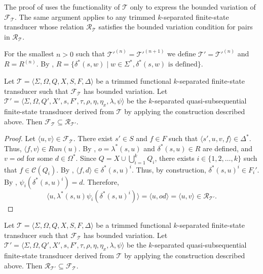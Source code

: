 The proof of  uses the functionality of $\mathcal{T}$
only to express the bounded variation of $\mathcal{F}_\mathcal{T}$. The same argument
applies to any trimmed $k$-separated finite-state transducer whose relation
$\mathcal{R}_\mathcal{T}$ satisfies the bounded variation condition for pairs in
$\mathcal{R}_\mathcal{T}$.

For the smallest $n > 0$ such that $\mathcal{T}'^{(n)} = \mathcal{T}'^{(n+1)}$ we
define $\mathcal{T}' = \mathcal{T}'^{(n)}$ and $R = R^{(n)}$. By
, $R = \{ \delta^*(s, w) \mid w \in \Sigma^*,
\delta^*(s, w) \textrm{ is defined} \}$.

\begin{lemma}\label{lem:quasisubseq_inclusion_right}
  Let $\mathcal{T} = \langle \Sigma, \Omega, Q, X, S, F, \Delta \rangle$ be a trimmed
  functional $k$-separated finite-state transducer such that
  $\mathcal{F}_\mathcal{T}$ has bounded variation.
  Let $\mathcal{T}' = \langle \Sigma, \Omega, Q', X', s, F', \tau, \rho, \eta,
  \eta_x, \lambda, \psi \rangle$ be the $k$-separated quasi-subsequential
  finite-state transducer derived from $\mathcal{T}$ by applying the construction
  described above. Then $\mathcal{F}_\mathcal{T} \subseteq \mathcal{R}_\mathcal{T'}$.
\end{lemma}

\begin{proof}
  Let $\langle u, v \rangle \in \mathcal{F}_\mathcal{T}$. There exist $s' \in S$ and
  $f \in F$ such that $\langle s', u, v, f \rangle \in \Delta^*$. Thus, $\langle f, v
  \rangle \in Run(u)$. By , $o = \lambda^*(s, u)$ and
  $\delta^*(s, u) \in R$ are defined, and $v = od$ for some $d \in \Omega^*$. Since $Q
  = X \cup \bigcup_{i=1}^k Q_i$, there exists $i \in \{ 1, 2, \ldots, k \}$ such that
  $f \in \mathcal{C}(Q_i)$. By , $\langle f, d
  \rangle \in \delta^*(s, u)^i$. Thus, by construction, $\delta^*(s, u)^i \in F_i'$.
  By , $\psi_i(\delta^*(s, u)^i) = d$. Therefore,
  \begin{equation*}
    \langle u, \lambda^*(s, u) \psi_i(\delta^*(s, u)^i) \rangle = \langle u, od
    \rangle = \langle u, v \rangle \in \mathcal{R}_{\mathcal{T}'}.
  \end{equation*}
\end{proof}

\begin{lemma}\label{lem:quasisubseq_inclusion_left}
  Let $\mathcal{T} = \langle \Sigma, \Omega, Q, X, S, F, \Delta \rangle$ be a trimmed
  functional $k$-separated finite-state transducer such that
  $\mathcal{F}_\mathcal{T}$ has bounded variation.
  Let $\mathcal{T}' = \langle \Sigma, \Omega, Q', X', s, F', \tau, \rho, \eta,
  \eta_x, \lambda, \psi \rangle$ be the $k$-separated quasi-subsequential
  finite-state transducer derived from $\mathcal{T}$ by applying the construction
  described above. Then $\mathcal{R}_{\mathcal{T}'} \subseteq
  \mathcal{F}_\mathcal{T}$.
\end{lemma}

